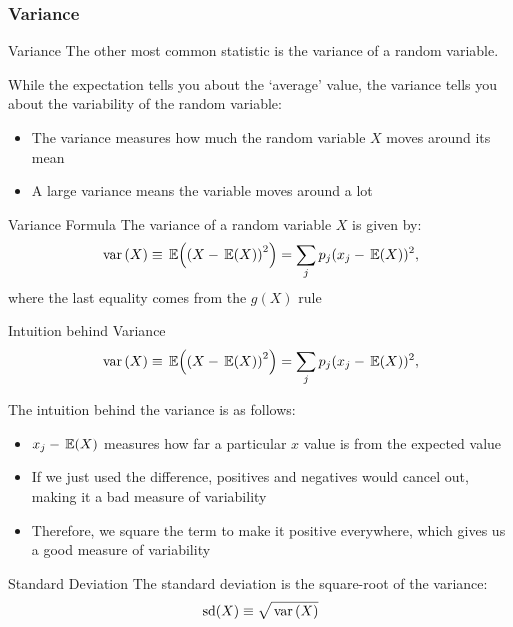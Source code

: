 \documentclass[aspectratio=169,t,11pt,table]{beamer}
\begin{document}
\subsubsection*{Variance}

\begin{frame}{Variance}
  The other most common statistic is the \alert{variance} of a random variable.

  \bigskip
  While the expectation tells you about the `average' value, the variance tells you about the variability of the random variable:
  \begin{itemize}
    \item The variance measures how much the random variable $X$ moves around its mean
    \item A large variance means the variable moves around a lot
  \end{itemize}
\end{frame}

\begin{frame}{Variance Formula}
  The variance of a random variable $X$ is given by:
  \[
    \var{X} \equiv \expec{\left( X - \expec{X} \right)^2 } = \sum_j p_j (x_j - \expec{X})^2,
  \]
  where the last equality comes from the $g(X)$ rule
\end{frame}

\begin{frame}{Intuition behind Variance}
  \vspace*{-2\bigskipamount}
  \[
    \var{X} \equiv \expec{\left( X - \expec{X} \right)^2 } = \sum_j p_j (x_j - \expec{X})^2,
  \]

  \bigskip
  The intuition behind the variance is as follows:
  \begin{itemize}
    \item $x_j - \expec{X}$ measures how far a particular $x$ value is from the expected value
    
    \pause
    \item If we just used the difference, positives and negatives would cancel out, making it a bad measure of variability
    
    \item Therefore, we square the term to make it positive everywhere, which gives us a good measure of variability
  \end{itemize}
\end{frame}

\begin{frame}{Standard Deviation}
  The \alert{standard deviation} is the square-root of the variance:
  \[
    \sd{X} \equiv \sqrt{\var{X}}
  \]
\end{frame}
  
\end{document}
